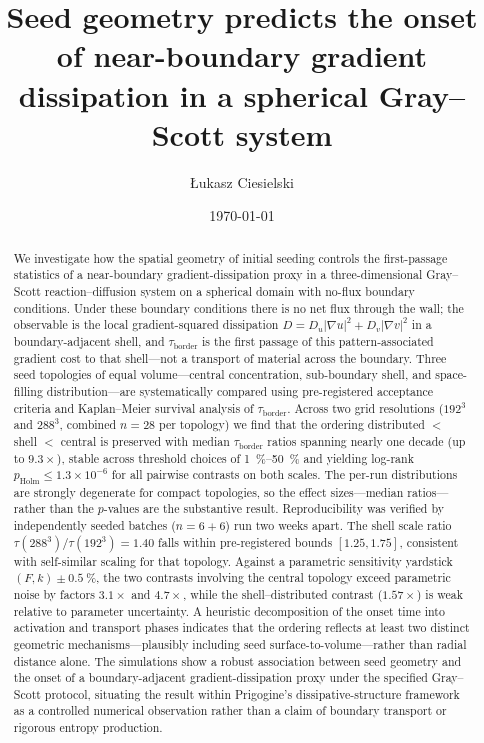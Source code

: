 \documentclass[aps,pre,preprint,superscriptaddress,nofootinbib,floatfix]{revtex4-2}
\newcommand{\tb}{\tau_{\mathrm{border}}}
\begin{document}
\title{Seed geometry predicts the onset of near-boundary gradient dissipation in a spherical Gray--Scott system}

\author{{\L}ukasz Ciesielski}

\date{\today}

\begin{abstract}
We investigate how the spatial geometry of initial seeding controls the first-passage statistics of a near-boundary gradient-dissipation proxy in a three-dimensional Gray--Scott reaction--diffusion system on a spherical domain with no-flux boundary conditions. Under these boundary conditions there is no net flux through the wall; the observable is the local gradient-squared dissipation $D = D_u|\nabla u|^2 + D_v|\nabla v|^2$ in a boundary-adjacent shell, and $\tb$ is the first passage of this pattern-associated gradient cost to that shell---not a transport of material across the boundary. Three seed topologies of equal volume---central concentration, sub-boundary shell, and space-filling distribution---are systematically compared using pre-registered acceptance criteria and Kaplan--Meier survival analysis of $\tb$.
Across two grid resolutions ($192^3$ and $288^3$, combined $n=28$ per topology) we find that the ordering distributed $<$ shell $<$ central is preserved with median $\tb$ ratios spanning nearly one decade (up to $9.3\times$), stable across threshold choices of \SIrange{1}{50}{\percent} and yielding log-rank $p_{\mathrm{Holm}} \le 1.3\times10^{-6}$ for all pairwise contrasts on both scales. The per-run distributions are strongly degenerate for compact topologies, so the effect sizes---median ratios---rather than the $p$-values are the substantive result. Reproducibility was verified by independently seeded batches ($n=6+6$) run two weeks apart. The shell scale ratio $\tau(288^3)/\tau(192^3)=1.40$ falls within pre-registered bounds $[1.25,1.75]$, consistent with self-similar scaling for that topology. Against a parametric sensitivity yardstick $(F,k)\pm\SI{0.5}{\percent}$, the two contrasts involving the central topology exceed parametric noise by factors $3.1\times$ and $4.7\times$, while the shell--distributed contrast ($1.57\times$) is weak relative to parameter uncertainty.
A heuristic decomposition of the onset time into activation and transport phases indicates that the ordering reflects at least two distinct geometric mechanisms---plausibly including seed surface-to-volume---rather than radial distance alone.
The simulations show a robust association between seed geometry and the onset of a boundary-adjacent gradient-dissipation proxy under the specified Gray--Scott protocol, situating the result within Prigogine's dissipative-structure framework as a controlled numerical observation rather than a claim of boundary transport or rigorous entropy production.
\end{abstract}
\end{document}
